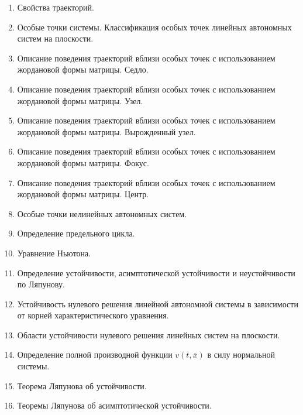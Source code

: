 \documentclass{article}
\begin{document}
\begin{enumerate}
  \item Свойства траекторий.

  \item Особые точки системы. Классификация особых точек линейных автономных систем на плоскости.

  \item Описание поведения траекторий вблизи особых точек с использованием жордановой формы матрицы. Седло.

  \item Описание поведения траекторий вблизи особых точек с использованием жордановой формы матрицы. Узел.

  \item Описание поведения траекторий вблизи особых точек с использованием жордановой формы матрицы. Вырожденный узел.
  
  \item Описание поведения траекторий вблизи особых точек с использованием жордановой формы матрицы. Фокус.
  
  \item Описание поведения траекторий вблизи особых точек с использованием жордановой формы матрицы. Центр.
  
  \item Особые точки нелинейных автономных систем.
  
  \item Определение предельного цикла.

  \item Уравнение Ньютона.
  
  \item Определение устойчивости, асимптотической устойчивости и неустойчивости по Ляпунову.

  \item Устойчивость нулевого решения линейной автономной системы в зависимости от корней характеристического уравнения.

  \item Области устойчивости нулевого решения линейных систем на плоскости.

  \item Определение полной производной функции $v(t,\bar{x})$ в силу нормальной системы.
  
  \item Теорема Ляпунова об устойчивости.

  \item Теоремы Ляпунова об асимптотической устойчивости.


\end{enumerate}
\end{document}
